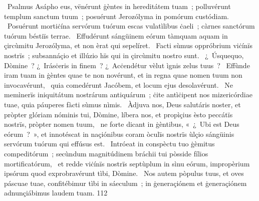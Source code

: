 {~Psalmus Asápho}
{%
eus, vënérunt ġèntes in hereditátem tuam~; polluvérunt templum sanctum tuum~; posuérunt Jerozólyma in pomórum custódiam.
~Posuérunt mortiċína servórum tuórum escas vulatìlibus ċaeli~; càrnes sanctórum tuórum béstiïs terrae.
~Effudérunt sángüinem eórum tàmquam aquam in çircùmitu Jerozólyma, et non èrat qui sepelíret.
~Facti sùmus oppróbrium viċínïs nostrïs~; subsannáçio et illúzio hïs qui in çircùmitu nostro sunt.
~¿~Úsquequo, Dòmine~? ¿~Irásċeris in finem~? ¿~Acċendétur vèlut ìgnis zelus tuus~?
~Effùnde iram tuam in ġèntes quae te non novérunt, et in regna quae nomen tuum non invocavérunt,
~quia comedérunt Jacóbem, et locum ejus desolavérunt.
~Ne memìnerïs iniquitátum nostrárum antiquárum~; ċite antìċipent nos mizericórdiae tuae, quia páuperes fàcti sùmus nìmis.
~Àdjuva nos, Deus salutáris noster, et pròpter glóriam nóminis tui, Dòmine, líbera nos, et propìçius èsto peccátïs nostrïs, pròpter nomen tuum,
~ne forte dicant in ġèntibus, «~¿~Ubi est Deus eórum~?~», et innotéscat in naçiónibus coram òculïs nostrïs ùlçio sángüinis servórum tuórum qui effúsus est.
~Intróeat in conspèctu tuo ġèmitus compeditórum~; secùndum magnitúdinem bráchii tui pòsside fílios mortificatórum,
~et redde viċínïs nostrïs septùplum in sìnu eórum, impropèrium ipsórum quod exprobravérunt tìbi, Dòmine.
~Nos autem pòpulus tuus, et oves páscuae tuae, confitébimur tìbi in sáeculum~; in ġeneraçiónem et ġeneraçiónem adnunçiábimus laudem tuam.
}
{11}{2}
